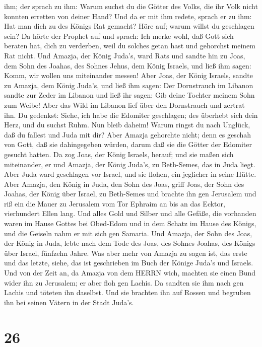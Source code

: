 ihm; der sprach zu ihm: Warum suchst du die Götter des Volks, die ihr
Volk nicht konnten erretten von deiner Hand?  Und da er mit
ihm redete, sprach er zu ihm: Hat man dich zu des Königs Rat gemacht?
Höre auf; warum willst du geschlagen sein? Da hörte der Prophet auf und
sprach: Ich merke wohl, daß Gott sich beraten hat, dich zu verderben,
weil du solches getan hast und gehorchst meinem Rat nicht. 
Und Amazja, der König Juda's, ward Rats und sandte hin zu Joas, dem Sohn
des Joahas, des Sohnes Jehus, dem König Israels, und ließ ihm sagen:
Komm, wir wollen uns miteinander messen!  Aber Joas, der
König Israels, sandte zu Amazja, dem König Juda's, und ließ ihm sagen:
Der Dornstrauch im Libanon sandte zur Zeder im Libanon und ließ ihr
sagen: Gib deine Tochter meinem Sohn zum Weibe! Aber das Wild im Libanon
lief über den Dornstrauch und zertrat ihn.  Du gedenkst:
Siehe, ich habe die Edomiter geschlagen; des überhebt sich dein Herz,
und du suchst Ruhm. Nun bleib daheim! Warum ringst du nach Unglück, daß
du fallest und Juda mit dir?  Aber Amazja gehorchte nicht;
denn es geschah von Gott, daß sie dahingegeben würden, darum daß sie die
Götter der Edomiter gesucht hatten.  Da zog Joas, der König
Israels, herauf; und sie maßen sich miteinander, er und Amazja, der
König Juda's, zu Beth-Semes, das in Juda liegt.  Aber Juda
ward geschlagen vor Israel, und sie flohen, ein jeglicher in seine
Hütte.  Aber Amazja, den König in Juda, den Sohn des Joas,
griff Joas, der Sohn des Joahas, der König über Israel, zu Beth-Semes
und brachte ihn gen Jerusalem und riß ein die Mauer zu Jerusalem vom Tor
Ephraim an bis an das Ecktor, vierhundert Ellen lang.  Und
alles Gold und Silber und alle Gefäße, die vorhanden waren im Hause
Gottes bei Obed-Edom und in dem Schatz im Hause des Königs, und die
Geiseln nahm er mit sich gen Samaria.  Und Amazja, der Sohn
des Joas, der König in Juda, lebte nach dem Tode des Joas, des Sohnes
Joahas, des Königs über Israel, fünfzehn Jahre.  Was aber
mehr von Amazja zu sagen ist, das erste und das letzte, siehe, das ist
geschrieben im Buch der Könige Juda's und Israels.  Und von
der Zeit an, da Amazja von dem HERRN wich, machten sie einen Bund wider
ihn zu Jerusalem; er aber floh gen Lachis. Da sandten sie ihm nach gen
Lachis und töteten ihn daselbst.  Und sie brachten ihn auf
Rossen und begruben ihn bei seinen Vätern in der Stadt Juda's.

\hypertarget{section-25}{%
\section{26}\label{section-25}}

